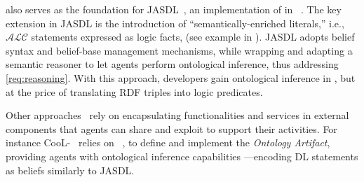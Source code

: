 \agentspeakdl{} also serves as the foundation for JASDL~\cite{DBLP:conf/dalt/KlapiscakB08},
an implementation of \agentspeakdl{} in \jason{}~\cite{bordini2007programming}.
%
The key extension in JASDL is the introduction of ``semantically-enriched literals,'' 
i.e., $\mathcal{ALC}$ statements expressed as logic facts,
(see example in ).
%
%
JASDL adopts \jason{} belief syntax and belief-base management mechanisms,
while wrapping and adapting a semantic reasoner to let agents perform ontological inference,
thus addressing \ref{req:reasoning}.
%
With this approach, 
developers gain ontological inference in \jason{},
but at the price of translating \ac{RDF} triples into logic predicates.
%


%
Other approaches~\cite{DBLP:journals/wias/MascardiABBR14,DBLP:conf/www/CharpenayZLB22, DBLP:conf/semweb/ONeillBBC21, DBLP:conf/emas/CiorteaBR18}
rely on encapsulating functionalities and services in external components that agents can share and exploit to support their activities.
%
For instance
CooL-\agentspeak{}~\cite{DBLP:journals/wias/MascardiABBR14} relies on \cartago{}~\cite{DBLP:books/sp/09/RicciPVO09},
to define and implement the \emph{Ontology Artifact},
providing agents with ontological inference capabilities%
---encoding \ac{DL} statements as beliefs similarly to JASDL.

